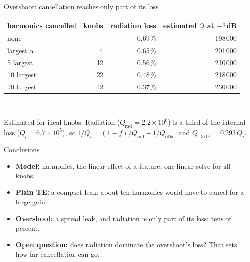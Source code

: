 \documentclass[11pt, aspectratio=169]{beamer}
\begin{document}
\begin{frame}{Overshoot: cancellation reaches only part of its loss}
    \vspace{0.20cm}
    \centering
    \begin{tabular}{lrrr}
        \toprule
        \textbf{harmonics cancelled} & \textbf{knobs} & \textbf{radiation loss} & \textbf{estimated $Q$ at $-3$\,dB} \\
        \midrule
        none & & 0.69\,\% & 198\,000 \\
        largest $\alpha$ & 4 & 0.65\,\% & 201\,000 \\
        5 largest & 12 & 0.56\,\% & 210\,000 \\
        10 largest & 22 & 0.48\,\% & 218\,000 \\
        20 largest & 42 & 0.37\,\% & 230\,000 \\
        \bottomrule
    \end{tabular}\\[0.35cm]
    \begin{minipage}{0.90\textwidth}
    {\footnotesize Estimated for ideal knobs. Radiation ($Q_\mathrm{rad}=2.2\times10^6$) is a third of the internal loss ($Q_i=6.7\times10^5$), so $1/Q_i=(1-f)/Q_\mathrm{rad}+1/Q_\mathrm{other}$ and $Q_{-3\,\mathrm{dB}}=0.293\,Q_i$.}
    \end{minipage}
\end{frame}

\begin{frame}{Conclusions}
    \begin{itemize}
        \setlength{\itemsep}{0.30cm}
        \item \textbf{Model:} harmonics, the linear effect of a feature, one linear solve for all knobs.
        \item \textbf{Plain TE:} a compact leak; about ten harmonics would have to cancel for a large gain.
        \item \textbf{Overshoot:} a spread leak, and radiation is only part of its loss: tens of percent.
        \item \textbf{Open question:} does radiation dominate the overshoot's loss? That sets how far cancellation can go.
    \end{itemize}
\end{frame}
\end{document}
